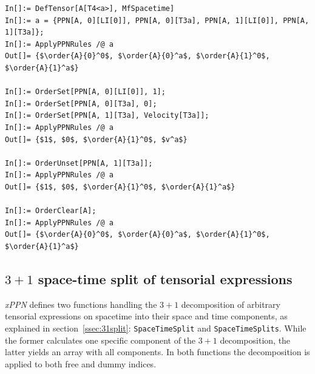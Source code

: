 \documentclass[notitlepage,a4paper,aps,prd,onecolumn,superscriptaddress,nofootinbib,groupedaddress,longbibliography]{revtex4-1}
\newcommand{\order}[2]{\accentset{#2}{#1}}
\newcommand{\xPPN}{\emph{xPPN}}
\begin{document}
\begin{lstlisting}
In[]:= DefTensor[A[T4<a>], MfSpacetime]
In[]:= a = {PPN[A, 0][LI[0]], PPN[A, 0][T3a], PPN[A, 1][LI[0]], PPN[A, 1][T3a]};
In[]:= ApplyPPNRules /@ a
Out[]= {$\order{A}{0}^0$, $\order{A}{0}^a$, $\order{A}{1}^0$, $\order{A}{1}^a$}

In[]:= OrderSet[PPN[A, 0][LI[0]], 1];
In[]:= OrderSet[PPN[A, 0][T3a], 0];
In[]:= OrderSet[PPN[A, 1][T3a], Velocity[T3a]];
In[]:= ApplyPPNRules /@ a
Out[]= {$1$, $0$, $\order{A}{1}^0$, $v^a$}

In[]:= OrderUnset[PPN[A, 1][T3a]];
In[]:= ApplyPPNRules /@ a
Out[]= {$1$, $0$, $\order{A}{1}^0$, $\order{A}{1}^a$}

In[]:= OrderClear[A];
In[]:= ApplyPPNRules /@ a
Out[]= {$\order{A}{0}^0$, $\order{A}{0}^a$, $\order{A}{1}^0$, $\order{A}{1}^a$}
\end{lstlisting}

\subsection{$3+1$ space-time split of tensorial expressions}\label{ssec:stsplit}
\xPPN{} defines two functions handling the $3+1$ decomposition of arbitrary tensorial expressions on spacetime into their space and time components, as explained in section~\ref{ssec:31split}: \lstinline/SpaceTimeSplit/ and \lstinline/SpaceTimeSplits/. While the former calculates one specific component of the $3+1$ decomposition, the latter yields an array with all components. In both functions the decomposition is applied to both free and dummy indices.
\end{document}

